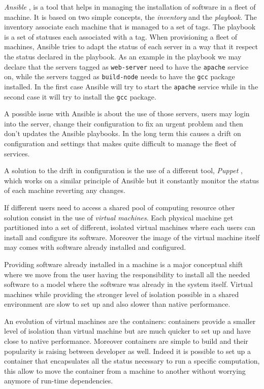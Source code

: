 \textit{Ansible} \cite{ansible}, \cite{provisioning} is a tool that helps in
managing the installation of software in a fleet of machine. It is based on two
simple concepts, the \textit{inventory} and the \textit{playbook}. The
inventory associate each machine that is managed to a set of tags. The playbook
is a set of statuses each associated with a tag. When provisioning a fleet of
machines, Ansible tries to adapt the status of each server in a way that it
respect the status declared in the playbook. As an example in the playbook we
may declare that the servers tagged as \texttt{web-server} need to have the
\texttt{apache} service on, while the servers tagged as \texttt{build-node}
needs to have the \texttt{gcc} package installed. In the first case Ansible
will try to start the \texttt{apache} service while in the second case it will
try to install the \texttt{gcc} package.

A possible issue with Ansible is about the use of those servers, users may
login into the server, change their configuration to fix an urgent problem and
then don't updates the Ansible playbooks. In the long term this causes a drift
on configuration and settings that makes quite difficult to manage the fleet of
services.

A solution to the drift in configuration is the use of a different tool,
\textit{Puppet} \cite{puppet}, \cite{provisioning} which works on a similar
principle of Ansible but it constantly monitor the status of each machine
reverting any changes.

If different users need to access a shared pool of computing resource other
solution consist in the use of \textit{virtual machines}. Each physical machine
get partitioned into a set of different, isolated virtual machines where each
users can install and configure its software. Moreover the image of the virtual
machine itself may comes with software already installed and configured.

Providing software already installed in a machine is a major conceptual shift
where we move from the user having the responsibility to install all the needed
software to a model where the software was already in the system itself.
Virtual machines while providing the stronger level of isolation possible in a
shared environment are slow to set up and also slower than native performance.

An evolution of virtual machines are the containers: containers provide a
smaller level of isolation than virtual machine but are much quicker to set up
and have close to native performance. Moreover containers are simple to build
and their popularity is raising between developer as well. Indeed it is
possible to set up a container that encapsulates all the status necessary to
run a specific computation, this allow to move the container from a machine to
another without worrying anymore of run-time dependencies.

